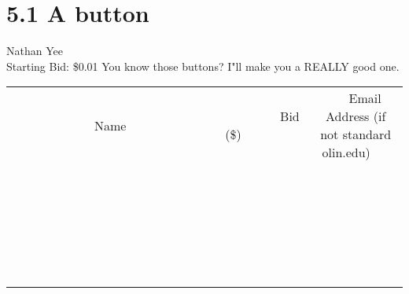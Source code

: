 \documentclass[11pt]{article}
\begin{document}
\section*{5.1 A button}
Nathan Yee
\\
Starting Bid: \$0.01
\newline
You know those buttons? I"ll make you a REALLY good one.
\\[6ex]
\begin{tabular}{c c c}
~~~~~~~~~~~~~Name~~~~~~~~~~~~~ & ~~~~~~~~~Bid (\$)~~~~~~~~~  & ~~~Email Address (if not standard olin.edu)~~~\\
 & & \\
\hline
 & & \\
\hline
 & & \\
\hline
 & & \\
\hline
 & & \\
\hline
 & & \\
\hline
 & & \\
\hline
 & & \\
\hline
 & & \\
\hline
 & & \\
\hline
 & & \\
\hline
 & & \\
\hline
 & & \\
\hline
 & & \\
\hline
 & & \\
\hline
 & & \\
\hline
 & & \\
\hline
 & & \\
\hline
 & & \\
\hline
 & & \\
\hline
 & & \\
\hline
 & & \\
\hline
 & & \\
\hline
 & & \\
\hline
 & & \\
\hline
 & & \\
\hline
\end{tabular}
\newpage
\end{document}
